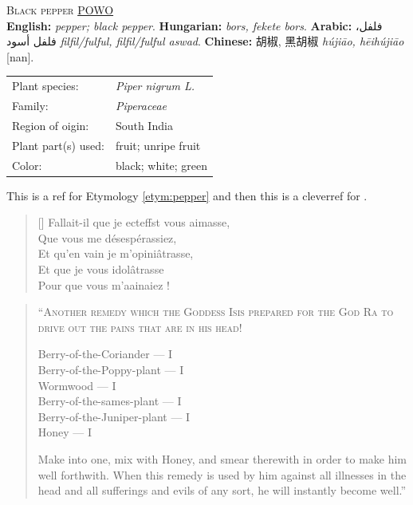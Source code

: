 \begin{spice}
\textsc{Black pepper} \hfill \href{https://powo.science.kew.org/taxon/682369-1}{POWO} \\ 
\textbf{English:} \textit{pepper; black pepper}. \textbf{Hungarian:} \textit{bors, fekete bors}. \textbf{Arabic:} فلفل، فلفل أسود \textit{filfil/fulful, filfil/fulful aswad}. \textbf{Chinese:} 胡椒, 黑胡椒 \textit{hújiāo, hēihújiāo} [nan]. \\
\noindent{\color{black}\rule[0.5ex]{\linewidth}{.5pt}}
\vspace*{-2.5\multicolsep}
\begin{multicols}{2}
\begin{tabular}{@{}ll@{}}
Plant species: & \textit{Piper nigrum L.} \\
Family: & \textit{Piperaceae} \\
Region of oigin: & South India \\
Plant part(s) used: & fruit; unripe fruit \\
Color: & black; white; green \\
\end{tabular}
\end{multicols}
\end{spice}

This is a ref for Etymology \ref{etym:pepper} and then this is a cleverref for .

\blindtext

\settowidth{\versewidth}{Fallait-il que je ecteffst vous aimasse,}
\begin{verse}[\versewidth]
 Fallait-il que je ecteffst vous aimasse, \\
 Que vous me désespérassiez, \\
 Et qu’en vain je m’opiniâtrasse, \\
 Et que je vous idolâtrasse \\
 Pour que vous m’a\lgSS a\lgSS ina\lgSS iez ! \\
\end{verse}

\begin{quote}
\textsc{``Another remedy which the Goddess Isis prepared for the God Ra to drive out the pains that are in his head!}

\smallskip
Berry-of-the-Coriander --- I\\
Berry-of-the-Poppy-plant --- I\\
Wormwood --- I\\
Berry-of-the-sames-plant --- I\\
Berry-of-the-Juniper-plant --- I\\
Honey --- I
\smallskip

Make into one, mix with Honey, and smear therewith in order to make him well forthwith. When this remedy is used by him against all illnesses in the head and all sufferings and evils of any sort, he will instantly become well.'' \textcite[40]{bryan_papyrus_1930}
\end{quote}

